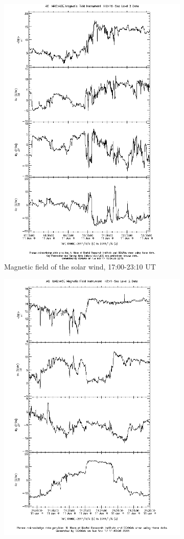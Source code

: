 \documentclass[10pt,a4paper]{article}
\begin{document}
\begin{figure}[h]
	\begin{subfigure}[h]{.5\textwidth}
		\centering
		\includegraphics[width=.8\linewidth]{ace-17-2310-b.png}
		\caption{Magnetic field of the solar wind, 17:00-23:10 UT}
		\label{ace1}
	\end{subfigure}
	\begin{subfigure}[h]{.5\textwidth}
		\centering
		\includegraphics[width=.8\linewidth]{ace-2115-2130-b.png}

\end{subfigure}
\end{figure}
\end{document}
